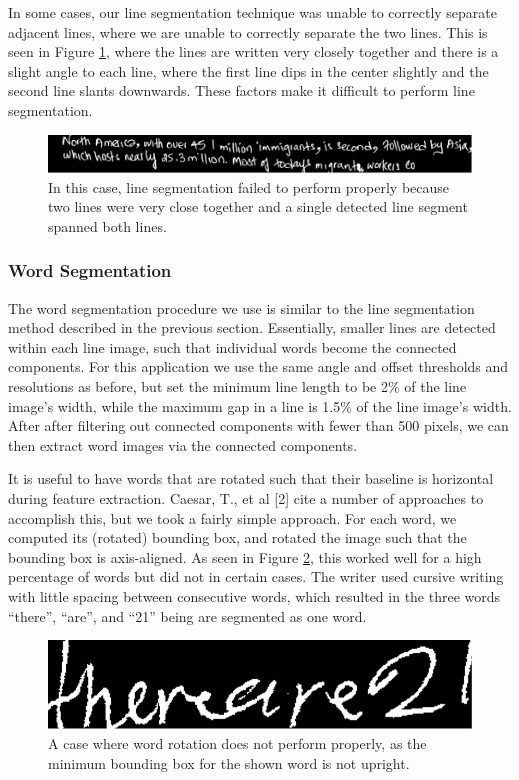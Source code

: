 \documentclass[paper=a4, fontsize=11pt]{scrartcl} %
\numberwithin{equation}{section} %
\numberwithin{figure}{section} %
\numberwithin{table}{section} %
\begin{document}
In some cases, our line segmentation technique was unable to correctly separate adjacent lines, where we are unable to correctly separate the two lines. This is seen in Figure \ref{fig:linefail}, where the lines are written very closely together and there is a slight angle to each line, where the first line dips in the center slightly and the second line slants downwards. These factors make it difficult to perform line segmentation.

\begin{figure}
\includegraphics{linefail.png}
\caption{In this case, line segmentation failed to perform properly because two lines were very close together and a single detected line segment spanned both lines.}
\label{fig:linefail}
\end{figure}

\subsubsection{Word Segmentation}
The word segmentation procedure we use is similar to the line
segmentation method described in the previous section. Essentially,
smaller lines are detected within each line image, such that
individual words become the connected components. For this application
we use the same angle and offset thresholds and resolutions as before,
but set the minimum line length to be 2\% of the line image's width,
while the maximum gap in a line is 1.5\% of the line image's
width. After after filtering out connected components with fewer than
500 pixels, we can then extract word images via the connected
components.

It is useful to have words that are rotated such that their baseline is horizontal during feature extraction. Caesar, T., et al [2] cite a number of approaches to accomplish this, but we took a fairly simple approach. For each word, we computed its (rotated) bounding box, and rotated the image such that the bounding box is axis-aligned. As seen in Figure \ref{fig:wordfail}, this worked well for a high percentage of words but did not in certain cases. The writer used cursive writing with little spacing between consecutive words, which resulted in the three words “there”, “are”, and “21” being are segmented as one word.

\begin{figure}
  \includegraphics{wordfail.png}
  \caption{A case where word rotation does not perform properly, as
    the minimum bounding box for the shown word is not upright.}
  \label{fig:wordfail}
\end{figure}
\end{document}
